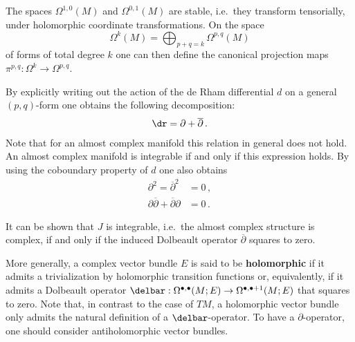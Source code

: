     \begin{property}
        The spaces $\Omega^{1,0}(M)$ and $\Omega^{0,1}(M)$ are stable, i.e.~they transform tensorially, under holomorphic coordinate transformations. On the space \[\Omega^k(M) = \bigoplus_{p+q=k}\Omega^{p,q}(M)\] of forms of total degree $k$ one can then define the canonical projection maps $\pi^{p,q}:\Omega^k\rightarrow\Omega^{p,q}$.
    \end{property}

    \begin{property}
        By explicitly writing out the action of the de Rham differential $d$ on a general $(p,q)$-form one obtains the following decomposition:
        \begin{gather}
            \dr=\partial+\overline{\partial}\,.
        \end{gather}
        Note that for an almost complex manifold this relation in general does not hold. An almost complex manifold is integrable if and only if this expression holds. By using the coboundary property of $d$ one also obtains
        \begin{align}
            \partial^2 = \overline{\partial}^2 &= 0\,,\\
            \partial\overline{\partial} + \overline{\partial}\partial &= 0\,.
        \end{align}
    \end{property}
    \begin{remark}[Integrability]
        It can be shown that $J$ is integrable, i.e.~the almost complex structure is complex, if and only if the induced Dolbeault operator $\overline{\partial}$ squares to zero.

        More generally, a complex vector bundle $E$ is said to be \textbf{holomorphic} if it admits a trivialization by holomorphic transition functions or, equivalently, if it admits a Dolbeault operator $\delbar:\Omega^{\bullet,\bullet}(M;E)\rightarrow\Omega^{\bullet,\bullet+1}(M;E)$ that squares to zero. Note that, in contrast to the case of $TM$, a holomorphic vector bundle only admits the natural definition of a $\delbar$-operator. To have a $\partial$-operator, one should consider antiholomorphic vector bundles.
    \end{remark}

